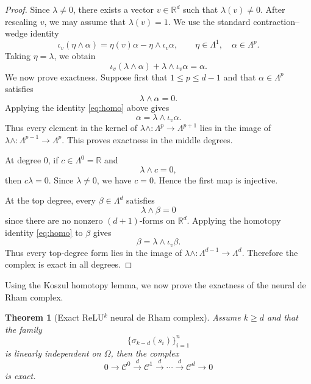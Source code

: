 \documentclass[pdflatex,sn-mathphys-num]{sn-jnl}
\newtheorem{theorem}{Theorem}
\numberwithin{equation}{section}
\numberwithin{theorem}{section}
\numberwithin{table}{section}
\numberwithin{figure}{section}
\begin{document}
\begin{proof}
Since $\lambda\neq 0$, there exists a vector $v\in\mathbb R^d$ such that $\lambda(v)\neq 0$. After rescaling $v$, we may assume that $\lambda(v)=1$. We use the standard contraction–wedge identity
\begin{equation}
\iota_v(\eta\wedge \alpha)=\eta(v)\alpha-\eta\wedge \iota_v\alpha,
\qquad \eta\in\Lambda^1,\quad \alpha\in\Lambda^p.
\end{equation}
Taking $\eta=\lambda$, we obtain
\begin{equation}
\iota_v(\lambda\wedge \alpha)+\lambda\wedge \iota_v\alpha=\alpha.
\end{equation}
We now prove exactness. Suppose first that $1\le p\le d-1$ and that $\alpha\in\Lambda^p$ satisfies
\begin{equation}
\lambda\wedge\alpha=0.
\end{equation}
Applying the identity \eqref{eq:homo} above gives
\begin{equation}
\alpha=\lambda\wedge \iota_v\alpha.
\end{equation}
Thus every element in the kernel of $\lambda\wedge:\Lambda^p\to\Lambda^{p+1}$ lies in the image of $\lambda\wedge:\Lambda^{p-1}\to\Lambda^p$. This proves exactness in the middle degrees.

At degree $0$, if $c\in\Lambda^0=\mathbb R$ and
\begin{equation}
\lambda\wedge c=0,
\end{equation}
then $c\lambda=0$. Since $\lambda\neq0$, we have $c=0$. Hence the first map is injective.

At the top degree, every $\beta\in\Lambda^d$ satisfies
\begin{equation}
\lambda\wedge\beta=0
\end{equation}
since there are no nonzero $(d+1)$-forms on $\mathbb R^d$. Applying the homotopy identity \eqref{eq:homo} to $\beta$ gives
\begin{equation}
\beta=\lambda\wedge\iota_v\beta.
\end{equation}
Thus every top-degree form lies in the image of $\lambda\wedge:\Lambda^{d-1}\to\Lambda^d$. Therefore the complex is exact in all degrees.
\end{proof}

Using the Koszul homotopy lemma, we now prove the exactness of the neural de Rham complex.
\begin{theorem}[Exact ReLU$^k$ neural de Rham complex]\label{thm:exact}
    Assume $k\ge d$ and that the family
    \begin{equation}
    \{\sigma_{k-d}(s_i)\}_{i=1}^n
    \end{equation}
    is linearly independent on $\Omega$, then the complex
    \begin{equation}\label{eq:derham}
        0\longrightarrow\mathcal C ^0 \xrightarrow{d} \mathcal C ^1 \xrightarrow{d}
        \cdots \xrightarrow{d} \mathcal C ^d \longrightarrow 0
    \end{equation}
    is exact.
\end{theorem}
\end{document}
